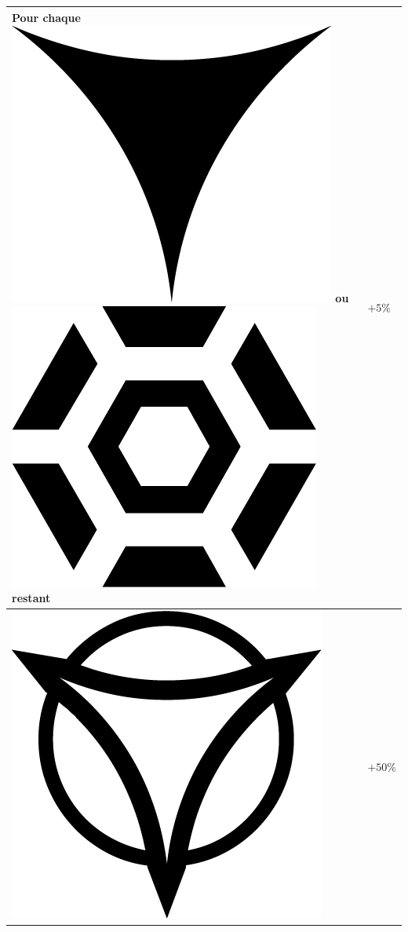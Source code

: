 \documentclass{article}
\begin{document}
\begin{center}
\begin{tabular}[b]{|p{5cm}|p{1cm}|}
		Pour chaque {\Large \includegraphics[height=\fontcharht\font`\B]{../img/result_echec_failure}} ou {\Large \includegraphics[height=\fontcharht\font`\B]{../img/result_menace_threat}} restant & $+5\%$ \\  
		\hline 
		{\Large \includegraphics[height=\fontcharht\font`\B]{../img/result_desastre_despair}} & $+50\%$ \\ 

\end{tabular}
\end{center}
\end{document}
